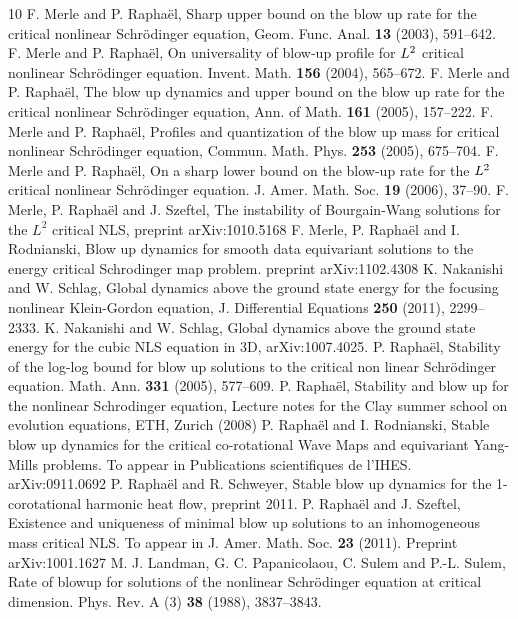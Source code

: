 \documentclass[11pt,a4paper,reqno]{amsart}
\theoremstyle{remark}
\numberwithin{equation}{section}
\begin{document}
\begin{thebibliography}{10}
 F. Merle and P. Rapha\"el, Sharp upper bound on the blow up rate for the critical nonlinear Schr\"odinger equation,   Geom. Func. Anal. \textbf{13} (2003), 591--642.
 F. Merle and P. Rapha\"el, On universality of blow-up profile for $L\sp 2$ critical nonlinear Schr\"odinger equation. Invent. Math. \textbf{156} (2004), 565--672.
 F. Merle and P. Rapha\"el, The blow up dynamics and  upper bound on the blow up rate for the critical nonlinear Schr\"odinger equation, Ann. of Math. \textbf{161} (2005), 157--222.
 F. Merle and P. Rapha\"el, Profiles and quantization of the blow up mass for critical nonlinear Schr\"odinger equation, Commun. Math. Phys. \textbf{253} (2005), 675--704.
 F. Merle and P. Rapha\"el, On a sharp lower bound on the blow-up rate for the $L\sp 2$ critical nonlinear Schr\"odinger equation.  J. Amer. Math. Soc.  \textbf{19}  (2006),   37--90.
 F. Merle, P. Rapha\"el and J. Szeftel,
The instability of Bourgain-Wang solutions for the $L^2$ critical NLS, preprint arXiv:1010.5168
  F. Merle, P. Rapha\"el and  I. Rodnianski,
    Blow up dynamics for smooth data equivariant solutions to the energy critical Schrodinger map problem.
preprint   arXiv:1102.4308  
 K. Nakanishi and  W. Schlag,  Global dynamics above the ground state energy for the focusing nonlinear Klein-Gordon equation,
J. Differential Equations \textbf{250} (2011),   2299--2333.
 K. Nakanishi and  W. Schlag,   Global dynamics above the ground state energy for the cubic NLS equation in 3D,  arXiv:1007.4025.
 P. Rapha\"el,  Stability of the log-log bound for blow up solutions to the critical non linear Schr\"odinger equation. Math. Ann. \textbf{331} (2005),  577--609. 
     P. Rapha\"el, Stability and blow up for the nonlinear Schrodinger equation, Lecture notes for the Clay summer school on evolution equations, ETH, Zurich (2008)
  P. Rapha\"el and I. Rodnianski, Stable blow up dynamics for the critical co-rotational Wave Maps and equivariant Yang-Mills problems. To appear in Publications scientifiques de l'IHES.  arXiv:0911.0692
 P. Rapha\"el and R. Schweyer, Stable blow up dynamics for the 1-corotational harmonic heat flow, preprint 2011.
 P. Rapha\"el and J. Szeftel, Existence and uniqueness of minimal blow up solutions to an inhomogeneous mass critical NLS. To appear in J. Amer. Math. Soc. \textbf{23} (2011). Preprint arXiv:1001.1627
 M. J. Landman, G. C. Papanicolaou,  C.  Sulem and  P.-L. Sulem,  Rate of blowup for solutions of the nonlinear Schr\"odinger equation at critical dimension. Phys. Rev. A (3) \textbf{38} (1988),   3837--3843.

\end{thebibliography}
\end{document}
